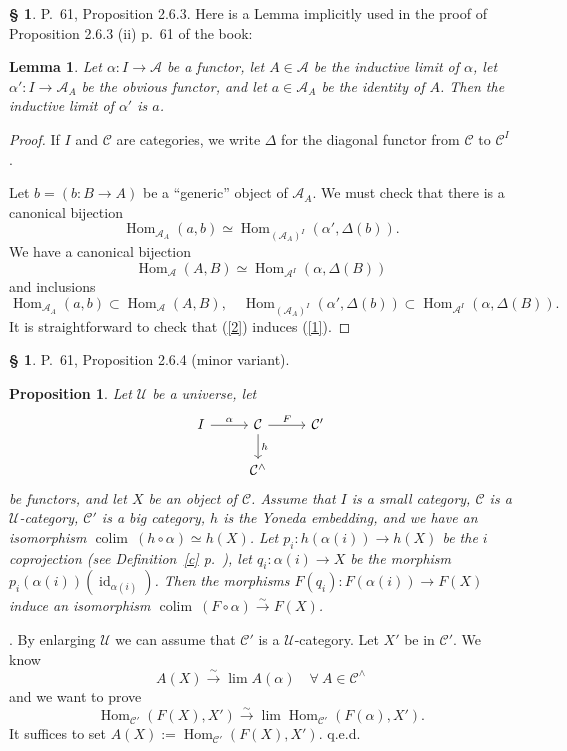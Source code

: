 \documentclass[12pt]{article}
\newtheorem{lem}[thm]{Lemma}
\newtheorem{prop}[thm]{Proposition}
\theoremstyle{remark}
\theoremstyle{definition}
\newtheorem{s}[thm]{\S}
\newcommand{\A}{\mathcal A}
\newcommand{\C}{\mathcal C}
\newcommand{\U}{\mathcal U}
\newcommand{\mv}{ (minor variant)}
\DeclareMathOperator*{\co}{colim}
\DeclareMathOperator{\id}{id}
\DeclareMathOperator{\Hom}{Hom}%
\begin{document}
\begin{s} 
P.~61, Proposition 2.6.3. Here is a Lemma implicitly used in the proof of Proposition 2.6.3 (ii) p.~61 of the book: 
%
\begin{lem} 
Let $\alpha:I\to\A$ be a functor, let $A\in\A$ be the inductive limit of $\alpha$, let $\alpha':I\to\A_A$ be the obvious functor, and let $a\in\A_A$ be the identity of $A$. Then the inductive limit of $\alpha'$ is $a$. 
\end{lem} 
%
\begin{proof}
If $I$ and $\C$ are categories, we write $\Delta$ for the diagonal functor from $\C$ to $\C^I$. 

Let $b=(b:B\to A)$ be a ``generic'' object of $\A_A$. We must check that there is a canonical bijection
%
\begin{equation}\label{1}
\Hom_{\A_A}(a,b)\simeq\Hom_{(\A_A)^I}(\alpha',\Delta(b)).
\end{equation}
%
We have a canonical bijection
%
\begin{equation}\label{2}
\Hom_\A(A,B)\simeq\Hom_{\A^I}(\alpha,\Delta(B))
\end{equation}
%
and inclusions 
$$
\Hom_{\A_A}(a,b)\subset\Hom_\A(A,B),\quad
%
\Hom_{(\A_A)^I}(\alpha',\Delta(b))\subset\Hom_{\A^I}(\alpha,\Delta(B)).
$$
It is straightforward to check that (\ref{2}) induces (\ref{1}).
\end{proof}
\end{s}
%
%
\begin{s} 
P.~61, Proposition 2.6.4\mv.
%
\begin{prop}\label{264}
Let $\U$ be a universe, let 
$$
\begin{tikzcd}
I\ar{r}{\alpha}&\C\ar{d}{h}\ar{r}{F}&\C'\\
&\C^\wedge
\end{tikzcd}
$$ 
be functors, and let $X$ be an object of $\C$. Assume that $I$ is a small category, $\C$ is a $\U$-category, $\C'$ is a big category, $h$ is the Yoneda embedding, and we have an isomorphism $\co\ (h\circ\alpha)\simeq h(X)$. Let $p_i:h(\alpha(i))\to h(X)$ be the $i$ coprojection (see Definition~\ref{c} p.~\pageref{c}), let $q_i:\alpha(i)\to X$ be the morphism $p_i(\alpha(i))(\id_{\alpha(i)})$. Then the morphisms $F(q_i):F(\alpha(i))\to F(X)$ induce an isomorphism $\co\ (F\circ\alpha)\xrightarrow\sim F(X)$.
\end{prop}
%
. By enlarging $\U$ we can assume that $\C'$ is a $\U$-category. Let $X'$ be in $\C'$. We know 
$$
A(X)\xrightarrow\sim\lim A(\alpha)\quad\forall\ A\in\C^\wedge 
$$ 
and we want to prove 
$$
\Hom_{\C'}(F(X),X')\xrightarrow\sim\lim\Hom_{\C'}(F(\alpha),X'). 
$$ 
It suffices to set $A(X):=\Hom_{\C'}(F(X),X')$. q.e.d.
\end{s}
\end{document}
